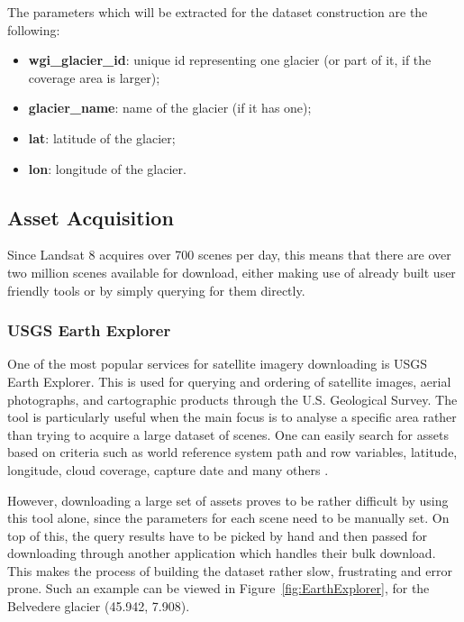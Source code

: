 \documentclass[12pt, a4paper]{report}
\begin{document}
	\par The parameters which will be extracted for the dataset construction are the following:
	\begin{itemize}
		\item \textbf{wgi\_glacier\_id}: unique id representing one glacier (or part of it, if the coverage area is larger);
		\item \textbf{glacier\_name}: name of the glacier (if it has one);
		\item \textbf{lat}: latitude of the glacier;
		\item \textbf{lon}: longitude of the glacier.
	\end{itemize}

	\subsection{Asset Acquisition}
	
	\par Since Landsat 8 acquires over 700 scenes per day, this means that there are over two million scenes available for download, either making use of already built user friendly tools or by simply querying for them directly.
	
	\subsubsection{USGS Earth Explorer}
	
	\par One of the most popular services for satellite imagery downloading is USGS Earth Explorer. This is used for querying and ordering of satellite images, aerial photographs, and cartographic products through the U.S. Geological Survey. The tool is particularly useful when the main focus is to analyse a specific area rather than trying to acquire a large dataset of scenes. One can easily search for assets based on criteria such as world reference system path and row variables, latitude, longitude, cloud coverage, capture date and many others \cite{USGS}.
	
	\par However, downloading a large set of assets proves to be rather difficult by using this tool alone, since the parameters for each scene need to be manually set. On top of this, the query results have to be picked by hand and then passed for downloading through another application which handles their bulk download. This makes the process of building the dataset rather slow, frustrating and error prone. Such an example can be viewed in Figure~\ref{fig:EarthExplorer}, for the Belvedere glacier (45.942, 7.908).
	
\end{document}
